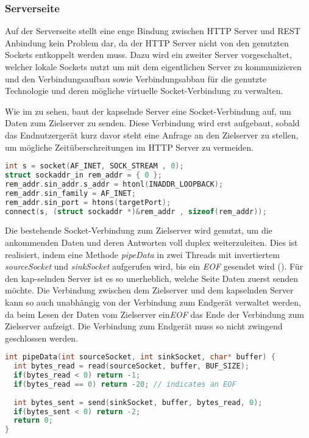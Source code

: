     \subsubsection{Serverseite}        
        Auf der Serverseite stellt eine enge Bindung zwischen HTTP Server und REST Anbindung kein Problem dar, da der HTTP Server nicht von den genutzten Sockets entkoppelt werden muss. Dazu wird ein zweiter Server vorgeschaltet, welcher lokale Sockets nutzt um mit dem eigentlichen Server zu kommunizieren und den Verbindungsaufbau sowie Verbindungsabbau für die genutzte Technologie und deren mögliche virtuelle Socket-Verbindung zu verwalten.
        
        Wie im  zu sehen, baut der kapselnde Server eine Socket-Verbindung auf, um Daten zum Zielserver zu senden. Diese Verbindung wird erst aufgebaut, sobald das Endnutzergerät kurz davor steht eine Anfrage an den Zielserver zu stellen, um mögliche Zeitüberschreitungen im HTTP Server zu vermeiden.

        \begin{lstlisting}[frame=bt, label={lst:socket:create}, language=C, caption=Instanziierung eines Sockets (Servercode in C)]
int s = socket(AF_INET, SOCK_STREAM , 0);
struct sockaddr_in rem_addr = { 0 };
rem_addr.sin_addr.s_addr = htonl(INADDR_LOOPBACK);
rem_addr.sin_family = AF_INET;
rem_addr.sin_port = htons(targetPort);
connect(s, (struct sockaddr *)&rem_addr , sizeof(rem_addr));
        \end{lstlisting}        
        
        Die bestehende Socket-Verbindung zum Zielserver wird genutzt, um die ankommenden Daten und deren Antworten voll duplex weiterzuleiten. Dies ist realisiert, indem eine Methode {\it pipeData} in zwei Threads mit invertiertem {\it sourceSocket} und {\it sinkSocket} aufgerufen wird, bis ein {\it EOF} gesendet wird (). Für den kap-selnden Server ist es so unerheblich, welche Seite Daten zuerst senden möchte. Die Verbindung zwischen dem Zielserver und dem kapselnden Server kann so auch unabhängig von der Verbindung zum Endgerät verwaltet werden, da beim Lesen der Daten vom Zielserver ein{\it EOF} das Ende der Verbindung zum Zielserver aufzeigt. Die Verbindung zum Endgerät muss so nicht zwingend geschlossen werden.
        
        \begin{lstlisting}[frame=bt, label={lst:socket:data}, language=C, caption=Datenweiterleitung durch Sockets (Servercode in C)] 
int pipeData(int sourceSocket, int sinkSocket, char* buffer) {
  int bytes_read = read(sourceSocket, buffer, BUF_SIZE);
  if(bytes_read < 0) return -1;
  if(bytes_read == 0) return -20; // indicates an EOF
  
  int bytes_sent = send(sinkSocket, buffer, bytes_read, 0);
  if(bytes_sent < 0) return -2;
  return 0;
}
        \end{lstlisting}
        

